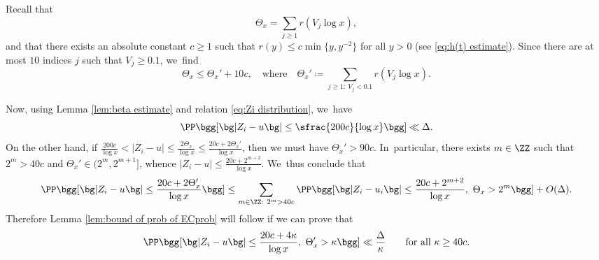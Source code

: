 Recall that
\[
\Theta_x=\sum_{j\ge1}r(V_j\log x),
\]
and that there exists an absolute constant $c\ge1$ such that $r(y)\le c \min\{y,y^{-2}\}$ for all $y>0$ (see \eqref{eq:h(t) estimate}). Since there are at most $10$ indices $j$ such that $V_j\ge 0.1$, we~find
\[
\Theta_x\le \Theta_x'+10c,\quad\text{where}\quad \Theta_x'\coloneqq \sum_{j\ge1:\ V_j<0.1}r(V_j\log x).
\]

Now, using Lemma \ref{lem:beta estimate} and relation \eqref{eq:Zi distribution}, we~have
\[
\PP\bgg[ \bg| Z_i - u \bg|\le \sfrac{200c}{\log x}\bgg] \ll \Delta.
\]
On the other hand, if $\frac{200c}{\log x}<|Z_i-u|\le \frac{2\Theta_x}{\log x}\le \frac{20c+2\Theta_x'}{\log x}$, then we must have $\Theta_x'>90c$. In~particular, there exists $m\in\ZZ$ such that $2^m>40c$ and $\Theta_x'\in(2^m,2^{m+1}]$, whence $|Z_i-u|\le \frac{20c + 2^{m+2}}{\log x}$. We~thus conclude that
\[
\PP\bgg[ \bg| Z_i - u \bg|\le \frac{20c+2\Theta_x'}{\log x}\bgg] \le \sum_{m\in\ZZ:\ 2^m>40c}
\PP\bgg[ \bg| Z_i - u_i \bg|\le \frac{20c+2^{m+2}}{\log x},\ \Theta_x>2^m\bgg] + O(\Delta).
\]
Therefore Lemma \ref{lem:bound of prob of ECprob} will follow if we can prove that
\begin{equation}
\label{eq:lem Bprob reduction 1}
\PP\bgg[ \bg| Z_i - u \bg|\le \frac{20c+4\kappa}{\log x},\ \Theta_x'>\kappa \bgg] \ll \frac{\Delta}{\kappa}
\qquad\text{for all}\ \kappa\ge 40c.
\end{equation}

